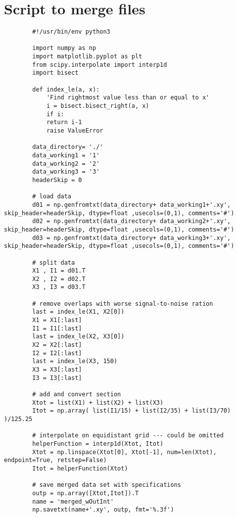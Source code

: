 	
	\section{Script to merge files}
	\enlargethispage{1cm}
	\begin{verbatim}
		#!/usr/bin/env python3
		
		import numpy as np
		import matplotlib.pyplot as plt
		from scipy.interpolate import interp1d
		import bisect	
		
		def index_le(a, x):
			'Find rightmost value less than or equal to x'
			i = bisect.bisect_right(a, x)
			if i:
			return i-1
			raise ValueError	
		
		data_directory= './'
		data_working1 = '1'
		data_working2 = '2'
		data_working3 = '3'
		headerSkip = 0
		
		# load data
		d01 = np.genfromtxt(data_directory+ data_working1+'.xy', skip_header=headerSkip, dtype=float ,usecols=(0,1), comments='#')
		d02 = np.genfromtxt(data_directory+ data_working2+'.xy', skip_header=headerSkip, dtype=float ,usecols=(0,1), comments='#')
		d03 = np.genfromtxt(data_directory+ data_working3+'.xy', skip_header=headerSkip, dtype=float ,usecols=(0,1), comments='#')
		
		# split data
		X1 , I1 = d01.T
		X2 , I2 = d02.T
		X3 , I3 = d03.T
		
		# remove overlaps with worse signal-to-noise ration
		last = index_le(X1, X2[0])
		X1 = X1[:last]
		I1 = I1[:last]
		last = index_le(X2, X3[0])
		X2 = X2[:last]
		I2 = I2[:last]
		last = index_le(X3, 150)
		X3 = X3[:last]
		I3 = I3[:last]
		
		# add and convert section
		Xtot = list(X1) + list(X2) + list(X3)
		Itot = np.array( list(I1/15) + list(I2/35) + list(I3/70) )/125.25
		
		# interpolate on equidistant grid --- could be omitted
		helperFunction = interp1d(Xtot, Itot)
		Xtot = np.linspace(Xtot[0], Xtot[-1], num=len(Xtot), endpoint=True, retstep=False)
		Itot = helperFunction(Xtot)
		
		# save merged data set with specifications
		outp = np.array([Xtot,Itot]).T
		name = 'merged_wOutInt'
		np.savetxt(name+'.xy', outp, fmt='%.3f')
	\end{verbatim}
	\newpage	
	
	
